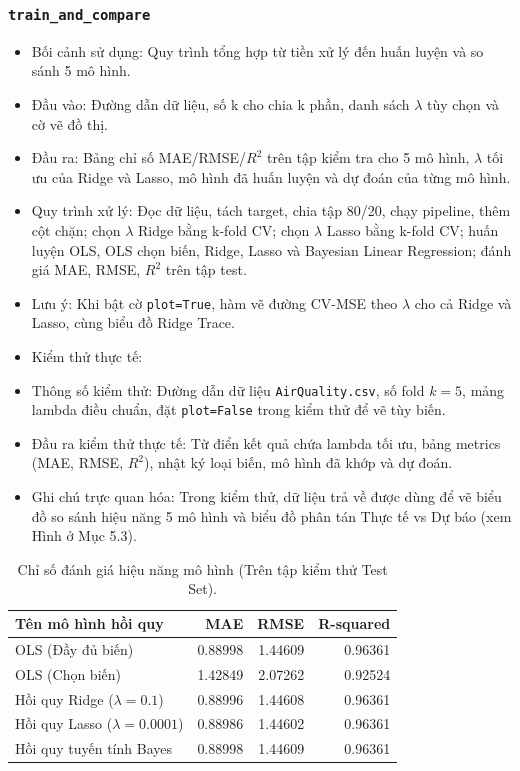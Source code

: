 \documentclass[a4paper]{article}
\newcommand{\code}[1]{\colorbox{light-gray}{\texttt{#1}}}
\begin{document}
\subsubsection{\texorpdfstring{\code{train\_and\_compare}}{train\_and\_compare}}
\begin{itemize}[leftmargin=*]
    \item Bối cảnh sử dụng: Quy trình tổng hợp từ tiền xử lý đến huấn luyện và so sánh 5 mô hình.
    \item Đầu vào: Đường dẫn dữ liệu, số k cho chia k phần, danh sách $\lambda$ tùy chọn và cờ vẽ đồ thị.
    \item Đầu ra: Bảng chỉ số MAE/RMSE/$R^2$ trên tập kiểm tra cho 5 mô hình, $\lambda$ tối ưu của Ridge và Lasso, mô hình đã huấn luyện và dự đoán của từng mô hình.
    \item Quy trình xử lý: Đọc dữ liệu, tách target, chia tập 80/20, chạy pipeline, thêm cột chặn; chọn $\lambda$ Ridge bằng k-fold CV; chọn $\lambda$ Lasso bằng k-fold CV; huấn luyện OLS, OLS chọn biến, Ridge, Lasso và Bayesian Linear Regression; đánh giá MAE, RMSE, $R^2$ trên tập test.
    \item Lưu ý: Khi bật cờ \texttt{plot=True}, hàm vẽ đường CV-MSE theo $\lambda$ cho cả Ridge và Lasso, cùng biểu đồ Ridge Trace.
    \item Kiểm thử thực tế:
    \item Thông số kiểm thử: Đường dẫn dữ liệu \texttt{AirQuality.csv}, số fold $k=5$, mảng lambda điều chuẩn, đặt \texttt{plot=False} trong kiểm thử để vẽ tùy biến.
    \item Đầu ra kiểm thử thực tế: Từ điển kết quả chứa lambda tối ưu, bảng metrics (MAE, RMSE, $R^2$), nhật ký loại biến, mô hình đã khớp và dự đoán.
    \item Ghi chú trực quan hóa: Trong kiểm thử, dữ liệu trả về được dùng để vẽ biểu đồ so sánh hiệu năng 5 mô hình và biểu đồ phân tán Thực tế vs Dự báo (xem Hình ở Mục 5.3).
\end{itemize}
\begin{table}[H]
    \centering
    \small
    \begin{tabular}{lrrr}
    \toprule
    \textbf{Tên mô hình hồi quy} & \textbf{MAE} & \textbf{RMSE} & \textbf{R-squared} \\
    \midrule
    OLS (Đầy đủ biến) & 0.88998 & 1.44609 & 0.96361 \\
    OLS (Chọn biến) & 1.42849 & 2.07262 & 0.92524 \\
    Hồi quy Ridge ($\lambda=0.1$) & 0.88996 & 1.44608 & 0.96361 \\
    Hồi quy Lasso ($\lambda=0.0001$) & 0.88986 & 1.44602 & 0.96361 \\
    Hồi quy tuyến tính Bayes & 0.88998 & 1.44609 & 0.96361 \\
    \bottomrule
    \end{tabular}
    \caption{Chỉ số đánh giá hiệu năng mô hình (Trên tập kiểm thử Test Set).}
\end{table}
\end{document}
